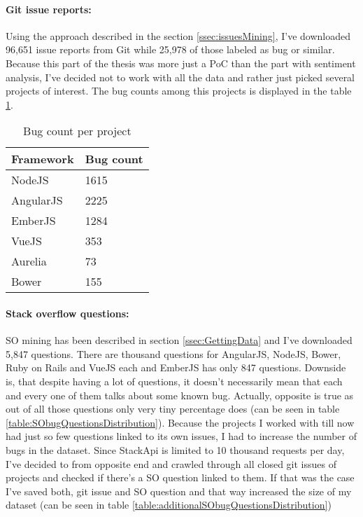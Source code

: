 \paragraph{Git issue reports:}
Using the approach described in the section \ref{ssec:issuesMining}, I've downloaded 96,651 issue reports from Git while 25,978 of those labeled as bug or similar. Because this part of the thesis was more just a PoC than the part with sentiment analysis, I've decided not to work with all the data and rather just picked several projects of interest. The bug counts among this projects is displayed in the table \ref{table:gitProjectIssuesDistribution}.


\begin{table}[H]
\centering
\begin{tabular}{ |p{3cm}||p{3cm}|}
 \hline
\textbf{ Framework }& \textbf{Bug count}\\
 \hline
 NodeJS   & 1615\\ \hline
 AngularJS &   2225 \\ \hline
 EmberJS & 1284\\ \hline
 VueJS & 353\\ \hline
 Aurelia & 73\\ \hline
 Bower & 155\\ \hline
\end{tabular}
\caption{Bug count per project}
\label{table:gitProjectIssuesDistribution}
\end{table}

\paragraph{Stack overflow questions:}
SO mining has been described in section \ref{ssec:GettingData} and I've downloaded 5,847 questions. There are thousand questions for AngularJS, NodeJS, Bower, Ruby on Rails and VueJS each and EmberJS has only 847 questions. Downside is, that despite having a lot of questions, it doesn't necessarily mean that each and every one of them talks about some known bug. Actually, opposite is true as out of all those questions only very tiny percentage does (can be seen in table \ref{table:SObugQuestionsDistribution}). Because the projects I worked with till now had just so few questions linked to its own issues, I had to increase the number of bugs in the dataset. Since StackApi is limited to 10 thousand requests per day, I've decided to from opposite end and crawled through all closed git issues of projects and checked if there's a SO question linked to them. If that was the case I've saved both, git issue and SO question and that way increased the size of my dataset (can be seen in table \ref{table:additionalSObugQuestionsDistribution})

